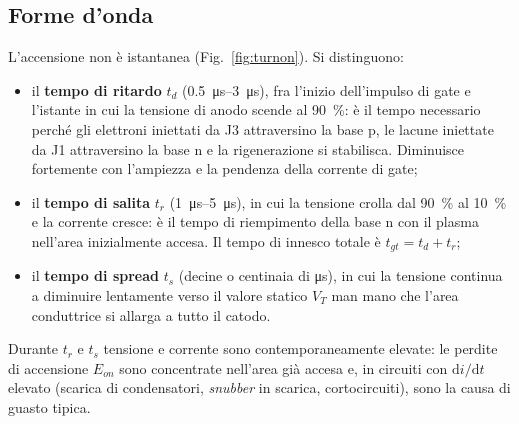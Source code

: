 \documentclass[11pt,a4paper]{article}
\newcommand{\didt}{\ensuremath{\mathrm{d}i/\mathrm{d}t}}
\newcommand{\en}[1]{\emph{#1}}   %
\begin{document}
\subsection{Forme d'onda}
L'accensione non è istantanea (Fig.~\ref{fig:turnon}). Si distinguono:
\begin{itemize}
  \item il \textbf{tempo di ritardo} $t_d$ (\qtyrange{0.5}{3}{\us}), fra l'inizio dell'impulso di gate e l'istante in cui la tensione di anodo scende al \qty{90}{\percent}: è il tempo necessario perché gli elettroni iniettati da J3 attraversino la base p, le lacune iniettate da J1 attraversino la base n e la rigenerazione si stabilisca. Diminuisce fortemente con l'ampiezza e la pendenza della corrente di gate;
  \item il \textbf{tempo di salita} $t_r$ (\qtyrange{1}{5}{\us}), in cui la tensione crolla dal \qty{90}{\percent} al \qty{10}{\percent} e la corrente cresce: è il tempo di riempimento della base n con il plasma nell'area inizialmente accesa. Il tempo di innesco totale è $t_{gt}=t_d+t_r$;
  \item il \textbf{tempo di spread} $t_s$ (decine o centinaia di \unit{\us}), in cui la tensione continua a diminuire lentamente verso il valore statico $V_T$ man mano che l'area conduttrice si allarga a tutto il catodo.
\end{itemize}
Durante $t_r$ e $t_s$ tensione e corrente sono contemporaneamente elevate: le perdite di accensione $E_{on}$ sono concentrate nell'area già accesa e, in circuiti con $\didt$ elevato (scarica di condensatori, \en{snubber} in scarica, cortocircuiti), sono la causa di guasto tipica.
\end{document}
